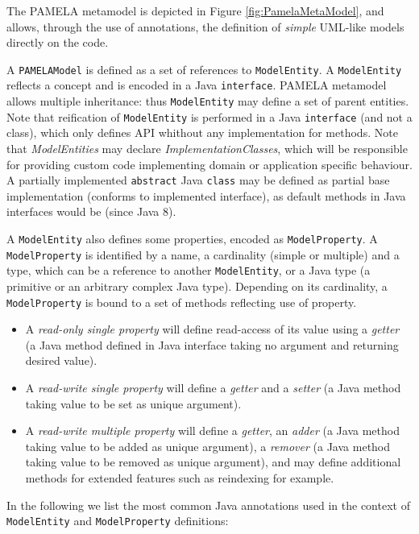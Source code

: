 The PAMELA metamodel is depicted in Figure  \ref{fig:PamelaMetaModel}, and allows, through the use of annotations, the definition of \emph{simple} UML-like models directly on the code.

A \texttt{PAMELAModel} is defined as a set of references to \texttt{ModelEntity}. A \texttt{ModelEntity} reflects a concept and is encoded in a Java \texttt{interface}. PAMELA metamodel allows multiple inheritance: thus \texttt{ModelEntity} may define a set of parent entities. Note that reification of \texttt{ModelEntity} is performed in a Java \texttt{interface} (and not a class), which only defines API whithout any implementation for methods. 
Note that \emph{ModelEntities} may declare \emph{ImplementationClasses}, which
will be responsible for providing custom code implementing domain or
application specific behaviour. A partially implemented \texttt{abstract} Java
\texttt{class} may be defined as partial base implementation (conforms to
implemented interface), as default methods in Java interfaces would be
(since Java 8).

A \texttt{ModelEntity} also defines some properties, encoded as \texttt{ModelProperty}. A \texttt{ModelProperty} is identified by a name, a cardinality (simple or multiple) and a type, which can be a reference to another \texttt{ModelEntity}, or a Java type (a primitive or an arbitrary complex Java type). Depending on its cardinality, a \texttt{ModelProperty} is bound to a set of methods reflecting use of property.
\begin{itemize}
    \item A \emph{read-only single property} will define read-access of its value using a \emph{getter} (a Java method defined in Java interface taking no argument and returning desired value).
    \item A \emph{read-write single property} will define a \emph{getter} and a \emph{setter} (a Java method taking value to be set as unique argument).
    \item A \emph{read-write multiple property} will define a \emph{getter}, an \emph{adder} (a Java method taking value to be added as unique argument), a \emph{remover} (a Java method taking value to be removed as unique argument), and may define additional methods for extended features such as reindexing for example.
\end{itemize}


In the following we list the most common Java annotations used in the context of \texttt{ModelEntity} and \texttt{ModelProperty} definitions:

